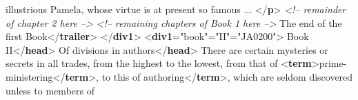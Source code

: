 \begin{shaded}
\hspace*{1em}\hspace*{1em}\hspace*{1em}\hspace*{1em} illustrious Pamela, whose virtue is at present so famous ... {</\textbf{p}>}\mbox{}\newline 
\textit{<!-- remainder of chapter 2 here -->}\mbox{}\newline 
{}\mbox{}\newline 
\textit{<!-- remaining chapters of Book 1 here -->}\mbox{}\newline 
{}The end of the first Book{</\textbf{trailer}>}\mbox{}\newline 
{</\textbf{div1}>}\mbox{}\newline 
{<\textbf{div1}\hspace*{1em}{type}="{book}"\hspace*{1em}{n}="{II}"\hspace*{1em}{xml:id}="{JA0200}">}\mbox{}\newline 
{}Book II{</\textbf{head}>}\mbox{}\newline 
{}\mbox{}\newline 
\hspace*{1em}Of divisions in authors{</\textbf{head}>}\mbox{}\newline 
\hspace*{1em}There are certain mysteries or secrets in all trades, from the highest\mbox{}\newline 
\hspace*{1em}\hspace*{1em}\hspace*{1em}\hspace*{1em} to the lowest, from that of {<\textbf{term}>}prime-ministering{</\textbf{term}>}, to this of\mbox{}\newline 
\hspace*{1em}authoring{</\textbf{term}>}, which are seldom discovered unless to members of\mbox{}\newline 

\end{shaded}
